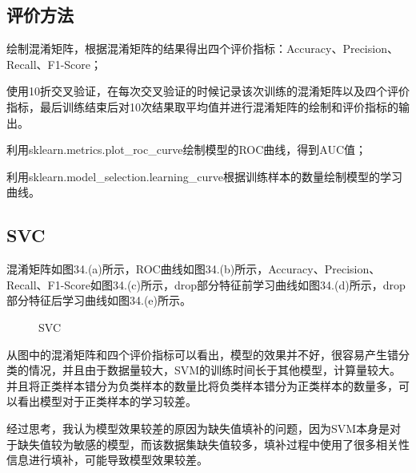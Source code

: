 \documentclass[../main.tex]{subfiles}
\begin{document}
    \subsection{评价方法}

        绘制混淆矩阵，根据混淆矩阵的结果得出四个评价指标：Accuracy、Precision、Recall、F1-Score；

        使用10折交叉验证，在每次交叉验证的时候记录该次训练的混淆矩阵以及四个评价指标，最后训练结束后对10次结果取平均值并进行混淆矩阵的绘制和评价指标的输出。
        
        利用sklearn.metrics.plot\_roc\_curve绘制模型的ROC曲线，得到AUC值；

        利用sklearn.model\_selection.learning\_curve根据训练样本的数量绘制模型的学习曲线。

    \subsection{SVC}

        混淆矩阵如图34.(a)所示，ROC曲线如图34.(b)所示，Accuracy、Precision、Recall、F1-Score如图34.(c)所示，drop部分特征前学习曲线如图34.(d)所示，drop部分特征后学习曲线如图34.(e)所示。

        \begin{figure}[H]
            \centering


            \caption{SVC}
        \end{figure}

        从图中的混淆矩阵和四个评价指标可以看出，模型的效果并不好，很容易产生错分类的情况，并且由于数据量较大，SVM的训练时间长于其他模型，计算量较大。
        并且将正类样本错分为负类样本的数量比将负类样本错分为正类样本的数量多，可以看出模型对于正类样本的学习较差。

        经过思考，我认为模型效果较差的原因为缺失值填补的问题，因为SVM本身是对于缺失值较为敏感的模型，而该数据集缺失值较多，填补过程中使用了很多相关性信息进行填补，可能导致模型效果较差。
\end{document}
